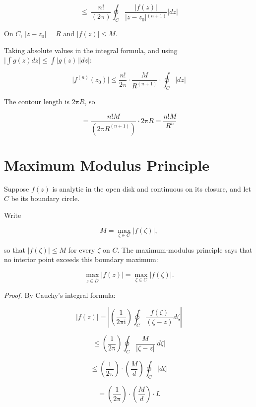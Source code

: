 \documentclass[11pt,a4paper]{article}
\theoremstyle{definition}
\theoremstyle{plain}
\begin{document}
\[
\le \ \frac{n!}{(2\mathrm{\pi})}\oint_{C}\frac{\vert{}f(z)\vert{}}{\vert{}z - z_{0}\vert{}^{(n + 1)}}\vert{}dz\vert{}
\]

On $C$, $\vert{}z - z_{0}\vert{} = R$ and $\vert{}f(z)\vert{} \le M$.

Taking absolute values in the integral formula, and using $\vert{}\int g(z)dz\vert{} \le \int\vert{}g(z)\vert{}\vert{}dz\vert{}$:

\[
\vert{}f^{(n)}(z_{0})\vert{} \le \frac{n!}{2\mathrm{\pi}} \cdot \frac{M}{R^{(n + 1)}} \cdot \oint_{C}\vert{}dz\vert{}
\]

The contour length is $2\mathrm{\pi}R$, so

\[
= \frac{n!M}{(2\mathrm{\pi}R^{(n + 1)})} \cdot 2\mathrm{\pi}R = \frac{n!M}{R^{n}}
\]

\section{Maximum Modulus Principle}

Suppose $f(z)$ is analytic in the open disk and continuous on its closure, and let $C$ be its boundary circle.

Write

\begin{equation}
M = \max_{\zeta \in C}\vert{}f(\zeta)\vert{},
\end{equation}

so that $\vert{}f(\zeta)\vert{} \le M$ for every $\zeta$ on $C$. The maximum-modulus
principle says that no interior point exceeds this boundary maximum:

\begin{equation}
\max_{z \in \bar{D}}\vert{}f(z)\vert{} = \max_{\zeta \in C}\vert{}f(\zeta)\vert{}.
\end{equation}

\textit{Proof.} By Cauchy’s integral formula:

\begin{equation}
\vert{}f(z)\vert{} = \left\vert{}\left(\frac{1}{2\mathrm{\pi}\mathrm{i}}\right)\oint_{C}\frac{f(\zeta)}{(\zeta - z)}d\zeta\right\vert{}
\end{equation}

\[
\le \left(\frac{1}{2\mathrm{\pi}}\right)\oint_{C}\frac{M}{\vert{}\zeta - z\vert{}}\vert{}d\zeta\vert{}
\]

\[
\le \left(\frac{1}{2\mathrm{\pi}}\right) \cdot\left(\frac{M}{d}\right)\oint_{C}\vert{}d\zeta\vert{}
\]

\[
= \left(\frac{1}{2\mathrm{\pi}}\right) \cdot\left(\frac{M}{d}\right) \cdot L
\]
\end{document}
